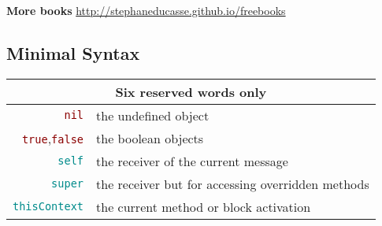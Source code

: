 \documentclass[notumble]{leaflet}
\newcommand{\code}[1]{\foreignlanguage{english}{\texttt{#1}}}
\begin{document}
\textbf{More books} \url{http://stephaneducasse.github.io/freebooks}




\vspace{-0.3cm}
\subsection{Minimal Syntax}
\noindent
\begin{tabularx}{\linewidth}{@{}rX@{}}
        \toprule
        \multicolumn{2}{c}{Six reserved words only}\\
        \midrule
        \textcolor{darkRed}{\code{nil}} & the undefined object\\
        \textcolor{darkRed}{\code{true}},\textcolor{darkRed}{\code{false}} & the boolean objects\\
        \textcolor{darkCyan}{\code{self}} &the receiver of the current message\\
        \textcolor{darkCyan}{\code{super}} &the receiver but for accessing overridden methods\\
        \textcolor{darkCyan}{\code{thisContext}} &the current method or block activation\\
\end{tabularx}
\end{document}
